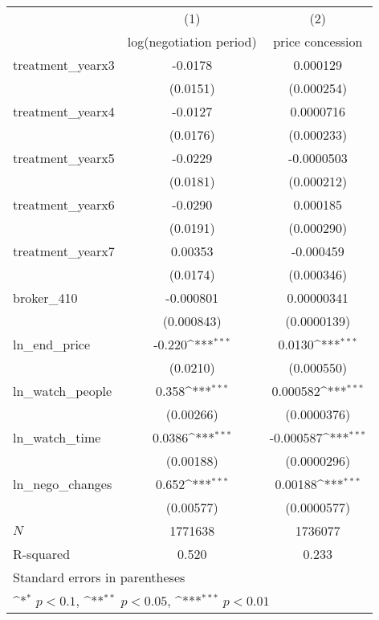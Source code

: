 {
\def\sym#1{\ifmmode^{#1}\else\(^{#1}\)\fi}
\begin{tabular}{l*{2}{c}}
\toprule
            &\multicolumn{1}{c}{(1)}&\multicolumn{1}{c}{(2)}\\
            &\multicolumn{1}{c}{log(negotiation period)}&\multicolumn{1}{c}{price concession}\\
\midrule
treatment\_yearx3&     -0.0178         &    0.000129         \\
            &    (0.0151)         &  (0.000254)         \\
\addlinespace
treatment\_yearx4&     -0.0127         &   0.0000716         \\
            &    (0.0176)         &  (0.000233)         \\
\addlinespace
treatment\_yearx5&     -0.0229         &  -0.0000503         \\
            &    (0.0181)         &  (0.000212)         \\
\addlinespace
treatment\_yearx6&     -0.0290         &    0.000185         \\
            &    (0.0191)         &  (0.000290)         \\
\addlinespace
treatment\_yearx7&     0.00353         &   -0.000459         \\
            &    (0.0174)         &  (0.000346)         \\
\addlinespace
broker\_410  &   -0.000801         &  0.00000341         \\
            &  (0.000843)         & (0.0000139)         \\
\addlinespace
ln\_end\_price&      -0.220\sym{***}&      0.0130\sym{***}\\
            &    (0.0210)         &  (0.000550)         \\
\addlinespace
ln\_watch\_people&       0.358\sym{***}&    0.000582\sym{***}\\
            &   (0.00266)         & (0.0000376)         \\
\addlinespace
ln\_watch\_time&      0.0386\sym{***}&   -0.000587\sym{***}\\
            &   (0.00188)         & (0.0000296)         \\
\addlinespace
ln\_nego\_changes&       0.652\sym{***}&     0.00188\sym{***}\\
            &   (0.00577)         & (0.0000577)         \\
\midrule
\(N\)       &     1771638         &     1736077         \\
R-squared   &       0.520         &       0.233         \\
\bottomrule
\multicolumn{3}{l}{\footnotesize Standard errors in parentheses}\\
\multicolumn{3}{l}{\footnotesize \sym{*} \(p<0.1\), \sym{**} \(p<0.05\), \sym{***} \(p<0.01\)}\\
\end{tabular}
}
